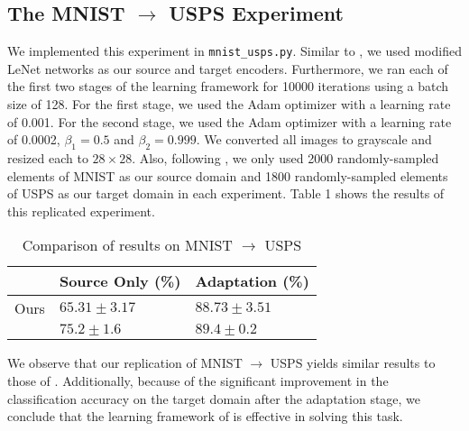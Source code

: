 \documentclass[14pt]{extarticle}
\begin{document}
		\subsection{The MNIST $\rightarrow$ USPS Experiment}
		We implemented this experiment in \texttt{mnist\_usps.py}. Similar to \cite{adda}, we used modified LeNet networks as our source and target encoders. Furthermore, we ran each of the first two stages of the learning framework for 10000 iterations using a batch size of 128. For the first stage, we used the Adam optimizer with a learning rate of 0.001. For the second stage, we used the Adam optimizer with a learning rate of 0.0002, $\beta_1 = 0.5$ and $\beta_2 = 0.999$. We converted all images to grayscale and resized each to $28 \times 28$. Also, following \cite{adda}, we only used 2000 randomly-sampled elements of MNIST as our source domain and 1800 randomly-sampled elements of USPS as our target domain in each experiment. Table 1 shows the results of this replicated experiment.
		\begin{table}[H]
			\centering
			\begin{tabular}{|P{40mm}|P{40mm}|P{40mm}|}
				\hline
				 & Source Only (\%) & Adaptation (\%)\\
				\hline
				Ours & $65.31 \pm 3.17$ & $88.73 \pm 3.51$\\
				\hline
				\cite{adda} & $75.2 \pm 1.6$ & $89.4 \pm 0.2$\\
				\hline
			\end{tabular}
			\caption{Comparison of results on MNIST $\rightarrow$ USPS}
		\end{table}
		We observe that our replication of MNIST $\rightarrow$ USPS yields similar results to those of \cite{adda}. Additionally, because of the significant improvement in the classification accuracy on the target domain after the adaptation stage, we conclude that the learning framework of \cite{adda} is effective in solving this task.
\end{document}
